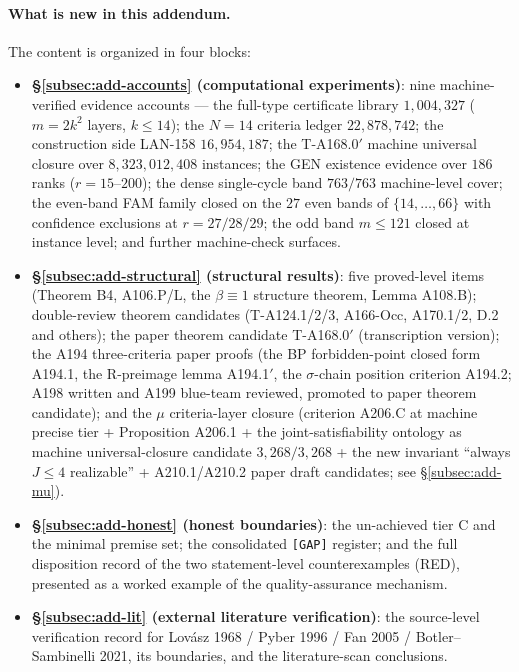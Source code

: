 \paragraph{What is new in this addendum.} The content is organized in four
blocks:
\begin{itemize}
\item \textbf{\S\ref{subsec:add-accounts} (computational experiments)}: nine
machine-verified evidence accounts --- the full-type certificate library
$1{,}004{,}327$ ($m=2k^2$ layers, $k\le14$); the $N=14$ criteria ledger
$22{,}878{,}742$; the construction side LAN-158 $16{,}954{,}187$; the
T-A168.0$'$ machine universal closure over $8{,}323{,}012{,}408$ instances; the GEN
existence evidence over $186$ ranks ($r=15$--$200$); the dense single-cycle
band $763/763$ machine-level cover; the even-band FAM family closed on the
$27$ even bands of $\{14,\dots,66\}$ with confidence exclusions at $r=27/28/29$;
the odd band $m\le121$ closed at instance level; and further machine-check
surfaces.
\item \textbf{\S\ref{subsec:add-structural} (structural results)}: five
proved-level items (Theorem B4, A106.P/L, the $\beta\equiv1$ structure
theorem, Lemma A108.B); double-review theorem candidates (T-A124.1/2/3,
A166-Occ, A170.1/2, D.2 and others); the paper theorem candidate T-A168.0$'$
(transcription version); the A194 three-criteria paper proofs (the BP
forbidden-point closed form A194.1, the R-preimage lemma A194.1$'$, the
$\sigma$-chain position criterion A194.2; A198 written and A199 blue-team
reviewed, promoted to paper theorem candidate); and the $\mu$ criteria-layer
closure (criterion A206.C at machine precise tier + Proposition A206.1 + the
joint-satisfiability ontology as machine universal-closure candidate
$3{,}268/3{,}268$ + the new invariant ``always $J\le4$ realizable'' +
A210.1/A210.2 paper draft candidates; see \S\ref{subsec:add-mu}).
\item \textbf{\S\ref{subsec:add-honest} (honest boundaries)}: the un-achieved
tier C and the minimal premise set; the consolidated \texttt{[GAP]} register;
and the full disposition record of the two statement-level counterexamples
(RED), presented as a worked example of the quality-assurance mechanism.
\item \textbf{\S\ref{subsec:add-lit} (external literature verification)}: the
source-level verification record for Lov\'{a}sz 1968 / Pyber 1996 / Fan 2005 /
Botler--Sambinelli 2021, its boundaries, and the literature-scan conclusions.
\end{itemize}

